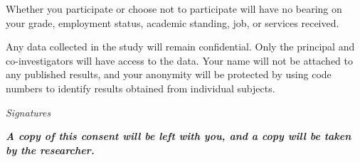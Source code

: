 \documentclass{article}
\begin{document}
\begin{appendices}
Whether you participate or choose not to participate will have no bearing on your grade, employment status, academic standing, job, or services received.

Any data collected in the study will remain confidential.  Only the principal and co-investigators will have access to the data.  Your name will not be attached to any published results, and your anonymity will be protected by using code numbers to identify results obtained from individual subjects.

\begin{center}
    \textit{Signatures}
\end{center}

\emph{\textbf{A copy of this consent will be left with you, and a copy
will be taken by the researcher.}}


\end{appendices}



%
%
%



\end{document}

